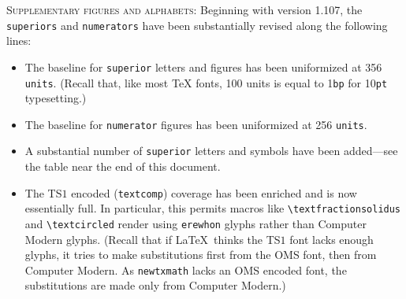 \documentclass[11pt]{amsart}
\begin{document}
\textsc{Supplementary figures and alphabets:}
Beginning with version 1.107, the {\tt superiors} and {\tt numerators} have been substantially revised along the following lines:
\begin{itemize}
\item
The baseline for {\tt superior} letters and figures has been uniformized at 356 {\tt units}. (Recall that, like most TeX fonts, 100 units is equal to 1{\tt bp} for 10{\tt pt} typesetting.)
\item
The baseline for {\tt numerator} figures has been uniformized at 256 {\tt units}.
\item A substantial number of {\tt superior} letters and symbols have been added---see the table near the end of this document.
\item 
The TS$1$ encoded ({\tt textcomp}) coverage has been enriched and is now essentially full. In particular, this permits macros like \verb|\textfractionsolidus| and \verb|\textcircled| render using {\tt erewhon} glyphs rather than Computer Modern glyphs. (Recall that if \LaTeX\ thinks the TS$1$ font lacks enough glyphs, it tries to make substitutions first from the OMS font, then from Computer Modern. As {\tt newtxmath} lacks an OMS encoded font, the substitutions are made only from Computer Modern.) 
\end{itemize}
\end{document}

